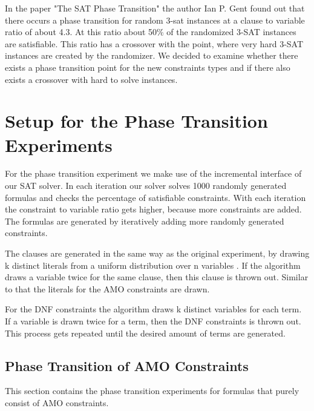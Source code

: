 In the paper "The SAT Phase Transition" \cite{gent1994sat} the author Ian P. Gent found out that there occurs a phase transition for random 3-sat instances at a clause to variable ratio of about 4.3. At this ratio about 50\% of the randomized 3-SAT instances are satisfiable. This ratio has a crossover with the point, where very hard 3-SAT instances are created by the randomizer. We decided to examine whether there exists a phase transition point for the new constraints types and if there also exists a crossover with hard to solve instances.

\section{Setup for the Phase Transition Experiments}

For the phase transition experiment we make use of the incremental interface of our SAT solver. In each iteration our solver solves 1000 randomly generated formulas and checks the percentage of satisfiable constraints. With each iteration the constraint to variable ratio gets higher, because more constraints are added. The formulas are generated by iteratively adding more randomly generated constraints.

The clauses are generated in the same way as the original experiment, by drawing k distinct literals from a uniform distribution over n variables \cite{gent1994sat}. If the algorithm draws a variable twice for the same clause, then this clause is thrown out. Similar to that the literals for the AMO constraints are drawn.

For the DNF constraints the algorithm draws k distinct variables for each term. If a variable is drawn twice for a term, then the DNF constraints is thrown out. This process gets repeated until the desired amount of terms are generated.

\subsection{Phase Transition of AMO Constraints}

This section contains the phase transition experiments for formulas that purely consist of AMO constraints.



